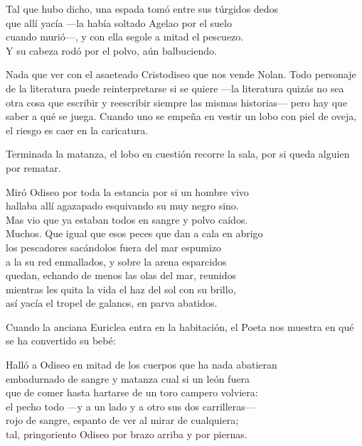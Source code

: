 \begin{versocita}
Tal que hubo dicho, una espada tomó entre sus túrgidos dedos\\
que allí yacía ---la había soltado Agelao por el suelo\\
cuando murió---, y con ella segole a mitad el pescuezo.\\
Y su cabeza rodó por el polvo, aún balbuciendo.
\end{versocita}

Nada que ver con el asaeteado Cristodiseo que nos vende Nolan. Todo personaje de la literatura puede reinterpretarse si se quiere ---la literatura quizás no sea otra cosa que escribir y reescribir siempre las mismas historias--- pero hay que saber a qué se juega. Cuando uno se empeña en vestir un lobo con piel de oveja, el riesgo es caer en la caricatura.

Terminada la matanza, el lobo en cuestión recorre la sala, por si queda alguien por rematar.

\begin{versocita}
Miró Odiseo por toda la estancia por si un hombre vivo\\
hallaba allí agazapado esquivando su muy negro sino.\\
Mas vio que ya estaban todos en sangre y polvo caídos.\\
Muchos. Que igual que esos peces que dan a cala en abrigo\\
los pescadores sacándolos fuera del mar espumizo\\
a la su red enmallados, y sobre la arena esparcidos\\
quedan, echando de menos las olas del mar, reunidos\\
mientras les quita la vida el haz del sol con su brillo,\\
así yacía el tropel de galanos, en parva abatidos.
\end{versocita}

Cuando la anciana Euriclea entra en la habitación, el Poeta nos muestra en qué se ha convertido su bebé:

\begin{versocita}
Halló a Odiseo en mitad de los cuerpos que ha nada abatieran\\
embadurnado de sangre y matanza cual si un león fuera\\
que de comer hasta hartarse de un toro campero volviera:\\
el pecho todo ---y a un lado y a otro sus dos carrilleras---\\
rojo de sangre, espanto de ver al mirar de cualquiera;\\
tal, pringoriento Odiseo por brazo arriba y por piernas.
\end{versocita}

